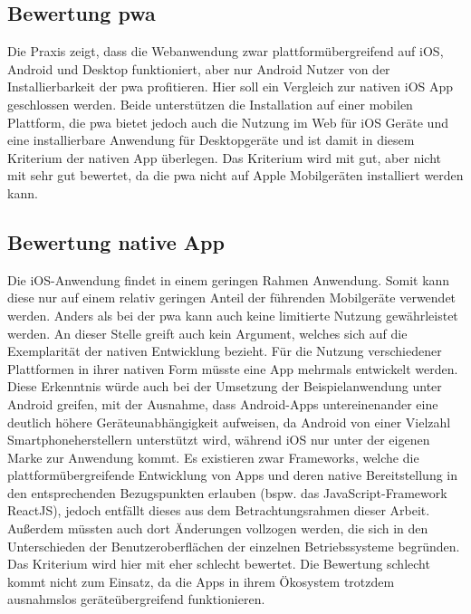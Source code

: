 \subsection{Bewertung \ac{pwa}}
Die Praxis zeigt, dass die Webanwendung zwar plattformübergreifend auf iOS, Android und Desktop funktioniert, aber nur Android Nutzer von der Installierbarkeit der \ac{pwa} profitieren.
Hier soll ein Vergleich zur nativen iOS App geschlossen werden. Beide unterstützen die Installation auf einer mobilen Plattform, die \ac{pwa} bietet jedoch auch die Nutzung im Web für iOS Geräte und eine installierbare Anwendung für Desktopgeräte und ist damit in diesem Kriterium der nativen App überlegen. Das Kriterium wird mit gut, aber nicht mit sehr gut bewertet, da die \ac{pwa} nicht auf Apple Mobilgeräten installiert werden kann.

\subsection{Bewertung native App}
Die iOS-Anwendung findet in einem geringen Rahmen Anwendung. Somit kann diese nur auf einem relativ geringen Anteil der führenden Mobilgeräte verwendet werden. Anders als bei der \ac{pwa} kann auch keine limitierte Nutzung gewährleistet werden. An dieser Stelle greift auch kein Argument, welches sich auf die Exemplarität der nativen Entwicklung bezieht. Für die Nutzung verschiedener Plattformen in ihrer nativen Form müsste eine App mehrmals entwickelt werden. Diese Erkenntnis würde auch bei der Umsetzung der Beispielanwendung unter Android greifen, mit der Ausnahme, dass Android-Apps untereinenander eine deutlich höhere Geräteunabhängigkeit aufweisen, da Android von einer Vielzahl Smartphoneherstellern unterstützt wird, während iOS nur unter der eigenen Marke zur Anwendung kommt. Es existieren zwar Frameworks, welche die plattformübergreifende Entwicklung von Apps und deren native Bereitstellung in den entsprechenden Bezugspunkten erlauben (bspw. das JavaScript-Framework ReactJS), jedoch entfällt dieses aus dem Betrachtungsrahmen dieser Arbeit. Außerdem müssten auch dort Änderungen vollzogen werden, die sich in den Unterschieden der Benutzeroberflächen der einzelnen Betriebssysteme begründen. Das Kriterium wird hier mit eher schlecht bewertet. Die Bewertung schlecht kommt nicht zum Einsatz, da die Apps in ihrem Ökosystem trotzdem ausnahmslos geräteübergreifend funktionieren.